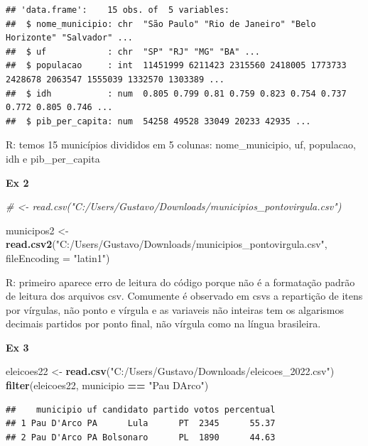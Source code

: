 \documentclass[
]{article}
\newenvironment{Shaded}{\begin{snugshade}}{\end{snugshade}}
\newcommand{\AttributeTok}[1]{\textcolor[rgb]{0.13,0.29,0.53}{#1}}
\newcommand{\CommentTok}[1]{\textcolor[rgb]{0.56,0.35,0.01}{\textit{#1}}}
\newcommand{\FunctionTok}[1]{\textcolor[rgb]{0.13,0.29,0.53}{\textbf{#1}}}
\newcommand{\NormalTok}[1]{#1}
\newcommand{\OtherTok}[1]{\textcolor[rgb]{0.56,0.35,0.01}{#1}}
\newcommand{\SpecialCharTok}[1]{\textcolor[rgb]{0.81,0.36,0.00}{\textbf{#1}}}
\newcommand{\StringTok}[1]{\textcolor[rgb]{0.31,0.60,0.02}{#1}}
\begin{document}
\begin{verbatim}
## 'data.frame':    15 obs. of  5 variables:
##  $ nome_municipio: chr  "São Paulo" "Rio de Janeiro" "Belo Horizonte" "Salvador" ...
##  $ uf            : chr  "SP" "RJ" "MG" "BA" ...
##  $ populacao     : int  11451999 6211423 2315560 2418005 1773733 2428678 2063547 1555039 1332570 1303389 ...
##  $ idh           : num  0.805 0.799 0.81 0.759 0.823 0.754 0.737 0.772 0.805 0.746 ...
##  $ pib_per_capita: num  54258 49528 33049 20233 42935 ...
\end{verbatim}

R: temos 15 municípios divididos em 5 colunas: nome\_municipio, uf,
populacao, idh e pib\_per\_capita

\textbf{Ex 2}

\begin{Shaded}
\begin{Highlighting}[]
\CommentTok{\# \textless{}{-} read.csv("C:/Users/Gustavo/Downloads/municipios\_pontovirgula.csv")}

\NormalTok{municipos2 }\OtherTok{\textless{}{-}} \FunctionTok{read.csv2}\NormalTok{(}\StringTok{"C:/Users/Gustavo/Downloads/municipios\_pontovirgula.csv"}\NormalTok{,}
                        \AttributeTok{fileEncoding =} \StringTok{"latin1"}\NormalTok{)}
\end{Highlighting}
\end{Shaded}

R: primeiro aparece erro de leitura do código porque não é a formatação
padrão de leitura dos arquivos csv. Comumente é observado em csvs a
repartição de itens por vírgulas, não ponto e vírgula e as variaveis não
inteiras tem os algarismos decimais partidos por ponto final, não
vírgula como na língua brasileira.

\textbf{Ex 3}

\begin{Shaded}
\begin{Highlighting}[]
\NormalTok{eleicoes22 }\OtherTok{\textless{}{-}} \FunctionTok{read.csv}\NormalTok{(}\StringTok{"C:/Users/Gustavo/Downloads/eleicoes\_2022.csv"}\NormalTok{)}
\FunctionTok{filter}\NormalTok{(eleicoes22, municipio }\SpecialCharTok{==} \StringTok{"Pau D\textquotesingle{}Arco"}\NormalTok{)}
\end{Highlighting}
\end{Shaded}

\begin{verbatim}
##    municipio uf candidato partido votos percentual
## 1 Pau D'Arco PA      Lula      PT  2345      55.37
## 2 Pau D'Arco PA Bolsonaro      PL  1890      44.63
\end{verbatim}
\end{document}
